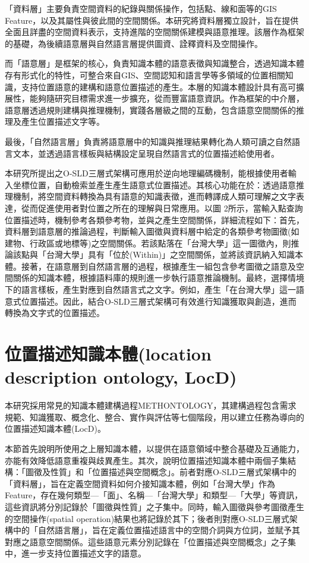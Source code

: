 「資料層」主要負責空間資料的紀錄與關係操作，包括點、線和面等的GIS Feature，以及其屬性與彼此間的空間關係。本研究將資料層獨立設計，旨在提供全面且詳盡的空間資料表示，支持進階的空間關係建模與語意推理。該層作為框架的基礎，為後續語意層與自然語言層提供圖資、詮釋資料及空間操作。

而「語意層」是框架的核心，負責知識本體的語意表徵與知識整合，透過知識本體存有形式化的特性，可整合來自GIS、空間認知和語言學等多領域的位置相關知識，支持位置語意的建構和語意位置描述的產生。本層的知識本體設計具有高可擴展性，能夠隨研究目標需求進一步擴充，從而豐富語意資訊。作為框架的中介層，語意層透過規則建構與推理機制，實踐各層級之間的互動，包含語意空間關係的推理及產生位置描述文字等。

最後，「自然語言層」負責將語意層中的知識與推理結果轉化為人類可讀之自然語言文本，並透過語言樣板與結構設定呈現自然語言式的位置描述給使用者。

本研究所提出之O-SLD三層式架構可應用於逆向地理編碼機制，能根據使用者輸入坐標位置，自動檢索並產生產生語意式位置描述。其核心功能在於：透過語意推理機制，將空間資料轉換為具有語意的知識表徵，進而轉譯成人類可理解之文字表達，從而促進使用者對位置之所在的理解與日常應用。以圖 2所示，當輸入點查詢位置描述時，機制參考各類參考物，並與之產生空間關係，詳細流程如下：首先，資料層到語意層的推論過程，判斷輸入圖徵與資料層中給定的各類參考物圖徵(如建物、行政區或地標等)之空間關係。若該點落在「台灣大學」這一圖徵內，則推論該點與「台灣大學」具有「位於(Within)」之空間關係，並將該資訊納入知識本體。接著，在語意層到自然語言層的過程，根據產生一組包含參考圖徵之語意及空間關係的知識本體，根據語料庫的規則進一步執行語意推論機制。最終，選擇情境下的語言樣板，產生對應到自然語言式之文字。例如，產生「在台灣大學」這一語意式位置描述。因此，結合O-SLD三層式架構可有效進行知識獲取與創造，進而轉換為文字式的位置描述。

\section{位置描述知識本體(location description ontology, LocD)}

本研究採用常見的知識本體建構過程METHONTOLOGY\citep{RN143}，其建構過程包含需求規範、知識獲取、概念化、整合、實作與評估等七個階段，用以建立任務為導向的位置描述知識本體(LocD)。

本節首先說明所使用之上層知識本體，以提供在語意領域中整合基礎及互通能力，亦能有效降低語意重複與歧異產生。其次，說明位置描述知識本體中兩個子集結構：「圖徵及性質」和「位置描述與空間概念」。前者對應O-SLD三層式架構中的「資料層」，旨在定義空間資料如何介接知識本體，例如「台灣大學」作為Feature，存在幾何類型—「面」、名稱—「台灣大學」和類型—「大學」等資訊，這些資訊將分別記錄於「圖徵與性質」之子集中。同時，輸入圖徵與參考圖徵產生的空間操作(spatial operation)結果也將記錄於其下；後者則對應O-SLD三層式架構中的「自然語言層」，旨在定義位置描述語言中的空間介詞與方位詞，並賦予其對應之語意空間關係。這些語意元素分別記錄在「位置描述與空間概念」之子集中，進一步支持位置描述文字的語意。

